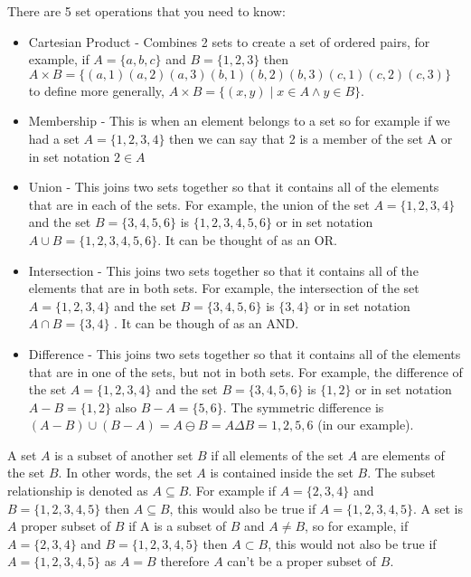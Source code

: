   There are 5 set operations that you need to know:
  \begin{itemize}
  	\item Cartesian Product - Combines 2 sets to create a set of ordered pairs, for example, if $A=\{a,b,c\}$ and $B=\{1,2,3\}$ then $A\times B = \{
  	\left(a,1\right)
  	\left(a,2\right)
  	\left(a,3\right)
  	\left(b,1\right)
  	\left(b,2\right)
  	\left(b,3\right)
  	\left(c,1\right)
  	\left(c,2\right)
  	\left(c,3\right)
  	\}$ to define more generally, $A \times B = \{(x,y) \mid x \in A \wedge y \in B\}$.
  	\item Membership - This is when an element belongs to a set so for example if we had a set $A=\{1,2,3,4\}$ then we can say that 2 is a member of the set A or in set notation $2\in A$
  	
  	\item Union - This joins two sets together so that it contains all of the elements that are in each of the sets. For example, the union of the set $A=\{1,2,3,4\}$ and the set $B=\{3,4,5,6\}$ is $\{1,2,3,4,5,6\}$ or in set notation $A \cup B = \{1,2,3,4,5,6\}$. It can be thought of as an OR.
  	
  	\item Intersection - This joins two sets together so that it contains all of the elements that are in both sets. For example, the intersection of the set $A=\{1,2,3,4\}$ and the set $B=\{3,4,5,6\}$ is $\{3,4\}$ or in set notation $A \cap B = \{3,4\}$ . It can be though of as an AND.
  	
  	\item Difference - This joins two sets together so that it contains all of the elements that are in one of the sets, but not in both sets. For example, the difference of the set $A=\{1,2,3,4\}$ and the set $B=\{3,4,5,6\}$ is $\{1,2\}$ or in set notation $A - B = \{1,2\}$ also $B - A = \{5,6\}$. The symmetric difference is $(A - B)\cup(B - A) = A \ominus B = A \Delta B = {1,2,5,6}$ (in our example).
  \end{itemize}
  
  A set $A$ is a subset of another set $B$ if all elements of the set $A$ are elements of the set $B$. In other words, the set $A$ is contained inside the set $B$. The subset relationship is denoted as $A\subseteq B$. For example if $A = \{2,3,4\}$ and $B = \{1,2,3,4,5\}$ then $A\subseteq B$, this would also be true if $A = \{1,2,3,4,5\}$. A set is $A$ proper subset of $B$ if A is a subset of $B$ and $A \neq B$, so for example,  if $A = \{2,3,4\}$ and $B = \{1,2,3,4,5\}$ then $A\subset B$, this would not also be true if $A = \{1,2,3,4,5\}$ as $A=B$ therefore $A$ can't be a proper subset of $B$.
  
